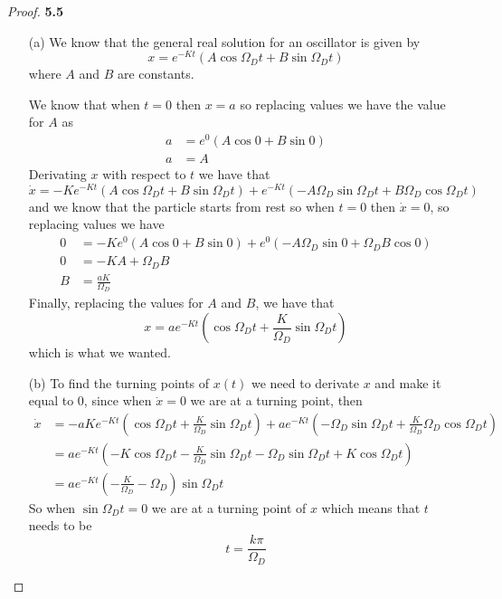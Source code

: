 \documentclass[11pt]{article}
\theoremstyle{definition}
\begin{document}
	\begin{proof}{\textbf{5.5}}
    \begin{itemize}
        \item [(a)] We know that the general real solution for an oscillator is
        given by
        $$x = e^{-Kt}(A\cos{\Omega_D t} + B\sin{\Omega_D t})$$
        where $A$ and $B$ are constants.
        
        We know that when $t=0$ then $x=a$ so replacing values we have the
        value for $A$ as
        \begin{align*}
            a &= e^0(A\cos 0 + B \sin 0) \\
            a &= A
        \end{align*}
        Derivating $x$ with respect to $t$ we have that
        $$\dot{x} = -Ke^{-Kt}(A\cos{\Omega_D t} + B\sin{\Omega_D t}) +
            e^{-Kt}(-A\Omega_D\sin{\Omega_D t} + B\Omega_D\cos{\Omega_D t})$$
        and we know that the particle starts from rest so when $t=0$ then
        $\dot{x} = 0$, so replacing values we have
        \begin{align*}
            0 &= -Ke^0(A\cos0 + B\sin0) + e^0(-A\Omega_D\sin0 + \Omega_DB\cos0) \\
            0 &= -KA + \Omega_D B \\
            B &= \frac{aK}{\Omega_D} 
        \end{align*}
        Finally, replacing the values for $A$ and $B$, we have that
        $$x = ae^{-Kt}\left(\cos{\Omega_D t} + \frac{K}{\Omega_D}\sin{\Omega_D t}\right)$$
        which is what we wanted.
        \item [(b)] To find the turning points of $x(t)$ we need to derivate
        $x$ and make it equal to $0$, since when $\dot{x} = 0$ we are at a
        turning point, then
        \begin{align*}
            \dot{x} &= -aKe^{-Kt}(\cos{\Omega_D t} + \frac{K}{\Omega_D}\sin{\Omega_D t})
                + a e^{-Kt}(-\Omega_D\sin{\Omega_D t} + \frac{K}{\Omega_D}\Omega_D\cos{\Omega_D t}) \\
                &= ae^{-Kt}(-K\cos{\Omega_D t} -\frac{K}{\Omega_D}\sin{\Omega_D t}
                -\Omega_D\sin{\Omega_D t} + K\cos{\Omega_D t}) \\
                &= ae^{-Kt}(-\frac{K}{\Omega_D}-\Omega_D)\sin\Omega_Dt
        \end{align*}
        So when $\sin\Omega_D t = 0$ we are at a turning point of $x$ which
        means that $t$ needs to be
        $$t = \frac{k\pi}{\Omega_D}$$

\end{itemize}
\end{proof}
\end{document}
